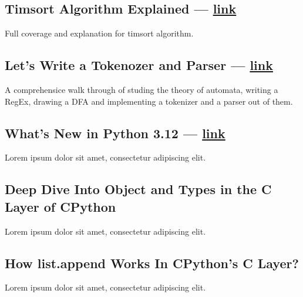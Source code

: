 \begin{multicols}{2}
\subsection{{Timsort Algorithm Explained --- \href{https://virgool.io/@liewpl/timsort-algorithm-explained-u41h0wv0jnax}{link}}}
\begin{zitemize}
\item Full coverage and explanation for {\ttfamily timsort} algorithm.
\end{zitemize}

\subsection{{Let's Write a Tokenozer and Parser --- \href{https://virgool.io/@liewpl/tokenizer-parser-in-python-ubzlsvukmdxz}{link}}}
\begin{zitemize}
\item A comprehensice walk through of studing the theory of automata, writing a RegEx, drawing a DFA and implementing a tokenizer and a parser out of them.
\end{zitemize}

\subsection{{What's New in Python 3.12 --- \href{https://virgool.io/@liewpl/python-3-12-whats-new-vpq99njtytc6}{link}}}
\begin{zitemize}
\item Lorem ipsum dolor sit amet, consectetur adipiscing elit.
\end{zitemize}

\subsection{{Deep Dive Into Object and Types in the C Layer of CPython}}
\begin{zitemize}
\item Lorem ipsum dolor sit amet, consectetur adipiscing elit.
\end{zitemize}

\subsection{{How list.append Works In CPython's C Layer?}}
\begin{zitemize}
\item Lorem ipsum dolor sit amet, consectetur adipiscing elit.
\end{zitemize}


\end{multicols}
